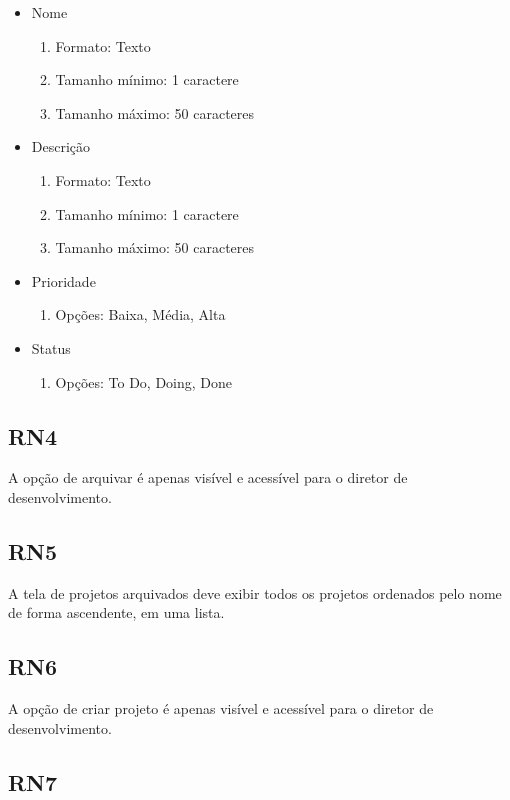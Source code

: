 \begin{itemize}
  \item Nome
  \begin{enumerate}
    \item Formato: Texto
    \item Tamanho mínimo: 1 caractere
    \item Tamanho máximo: 50 caracteres
  \end{enumerate}
  \item Descrição
  \begin{enumerate}
    \item Formato: Texto
    \item Tamanho mínimo: 1 caractere
    \item Tamanho máximo: 50 caracteres
  \end{enumerate}
  \item Prioridade
  \begin{enumerate}
    \item Opções: Baixa, Média, Alta
  \end{enumerate}
  \item Status
  \begin{enumerate}
    \item Opções: To Do, Doing, Done
  \end{enumerate}
\end{itemize}

\subsection{RN4}

A opção de arquivar é apenas visível e acessível para o diretor de desenvolvimento.

\subsection{RN5}

A tela de projetos arquivados deve exibir todos os projetos ordenados pelo nome de forma ascendente, em uma lista.

\subsection{RN6}

A opção de criar projeto é apenas visível e acessível para o diretor de desenvolvimento.

\subsection{RN7}

